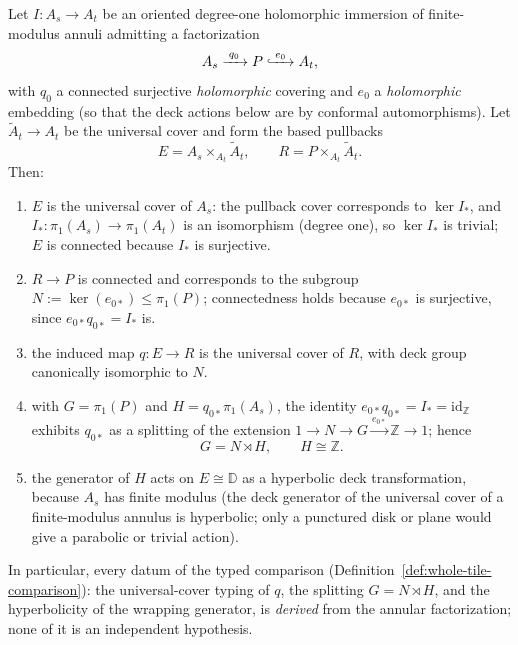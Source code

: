 
\begin{theorem}\label{thm:annular-normal-form}
Let $I\colon A_s\to A_t$ be an oriented degree-one holomorphic
immersion of finite-modulus annuli admitting a factorization
\[
 A_s\xrightarrow{\;q_0\;}P\lhook\joinrel\xrightarrow{\;e_0\;}A_t,
\]
with $q_0$ a connected surjective \emph{holomorphic} covering and
$e_0$ a \emph{holomorphic} embedding (so that the deck actions below
are by conformal automorphisms).  Let
$\widetilde A_t\to A_t$ be the universal cover and form the based
pullbacks
\[
 E=A_s\times_{A_t}\widetilde A_t,
 \qquad
 R=P\times_{A_t}\widetilde A_t .
\]
Then:
\begin{enumerate}
\item $E$ is the universal cover of $A_s$: the pullback cover
  corresponds to $\ker I_*$, and $I_*\colon\pi_1(A_s)\to\pi_1(A_t)$ is
  an isomorphism (degree one), so $\ker I_*$ is trivial; $E$ is
  connected because $I_*$ is surjective.
\item $R\to P$ is connected and corresponds to the subgroup
  $N:=\ker(e_{0*})\le\pi_1(P)$; connectedness holds because
  $e_{0*}$ is surjective, since $e_{0*}q_{0*}=I_*$ is.
\item the induced map $q\colon E\to R$ is the universal cover of $R$,
  with deck group canonically isomorphic to $N$.
\item with $G=\pi_1(P)$ and $H=q_{0*}\pi_1(A_s)$, the identity
  $e_{0*}q_{0*}=I_*=\mathrm{id}_{\mathbb Z}$ exhibits $q_{0*}$ as a
  splitting of the extension
  $1\to N\to G\xrightarrow{e_{0*}}\mathbb Z\to1$; hence
  \[
   G=N\rtimes H,\qquad H\cong\mathbb Z .
  \]
\item the generator of $H$ acts on $E\cong\mathbb D$ as a hyperbolic
  deck transformation, because $A_s$ has finite modulus (the deck
  generator of the universal cover of a finite-modulus annulus is
  hyperbolic; only a punctured disk or plane would give a parabolic or
  trivial action).
\end{enumerate}
In particular, every datum of the typed comparison
(Definition~\ref{def:whole-tile-comparison}): the universal-cover
typing of $q$, the splitting $G=N\rtimes H$, and the hyperbolicity of
the wrapping generator, is \emph{derived} from the annular
factorization; none of it is an independent hypothesis.
\end{theorem}

